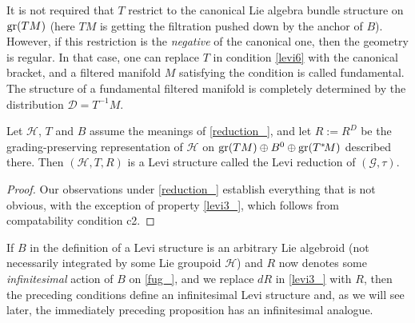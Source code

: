 \documentclass[leqno,12pt]{amsart} %
\begin{document}
It is not required that $T$ restrict to the canonical Lie algebra bundle structure on
$\operatorname{\operatorname{gr}}(TM)$ (here $TM$ is getting the filtration pushed down by the anchor of
$B$). However, if this restriction is the {\em negative} of the canonical one, then the
geometry is {\df regular}. In that case, one can replace $T$ in condition \eqref{levi6}
with the canonical bracket, and a filtered manifold $M$ satisfying the condition is called
{\df fundamental}. The structure of a fundamental filtered manifold is completely
determined by the distribution ${\mathcal D}=T^{-1}M$.

\begin{proposition}
  Let ${\mathcal {\mathcal H}}$, $T$ and $B$ assume the meanings of \ref{reduction_}, and
  let $R:= R^D$ be the grading-preserving representation of ${\mathcal H}$ on
  $\operatorname{\operatorname{gr}}(TM) \oplus B^0 \oplus \operatorname{\operatorname{gr}}(T^*\!M)$ described there. Then
  $({\mathcal H}, T, R)$ is a Levi structure called the {\df Levi reduction} of
  $({\mathcal G}, \tau)$.
\end{proposition}
\begin{proof}
  Our observations under \ref{reduction_} establish everything that is not obvious, with
  the exception of property \eqref{levi3_}, which follows from compatability condition c2.
\end{proof}

If $B$ in the definition of a Levi structure is an arbitrary Lie algebroid (not
necessarily integrated by some Lie groupoid ${\mathcal H} $) and $R$ now denotes some {\em
  infinitesimal} action of $B$ on \eqref{fug_}, and we replace $dR$ in \eqref{levi3_} with
$R$, then the preceding conditions define an {\df infinitesimal Levi structure} and, as we
will see later, the immediately preceding proposition has an infinitesimal analogue.
%
\end{document}
